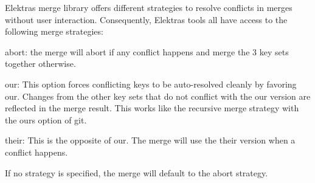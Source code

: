 Elektra\textquotesingle{}s merge library offers different strategies to resolve conflicts in merges without user interaction. Consequently, Elektra\textquotesingle{}s tools all have access to the following merge strategies\+:


\begin{DoxyItemize}
\item {\ttfamily abort}\+: the merge will abort if any conflict happens and merge the 3 key sets together otherwise.
\item {\ttfamily our}\+: This option forces conflicting keys to be auto-\/resolved cleanly by favoring {\ttfamily our}. Changes from the other key sets that do not conflict with the {\ttfamily our} version are reflected in the merge result. This works like the recursive merge strategy with the {\ttfamily ours} option of git.
\item {\ttfamily their}\+: This is the opposite of {\ttfamily our}. The merge will use the {\ttfamily their} version when a conflict happens.
\end{DoxyItemize}

If no strategy is specified, the merge will default to the abort strategy. 